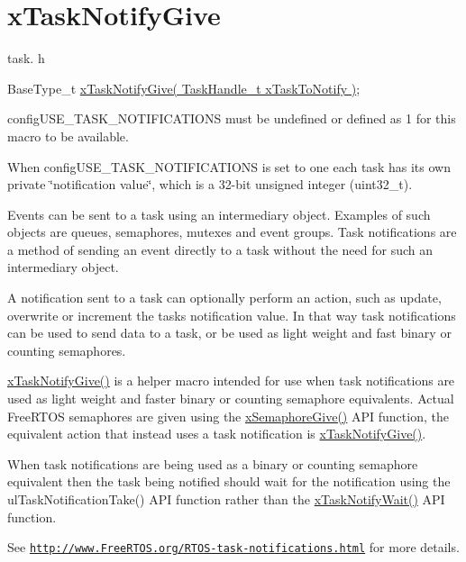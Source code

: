 \hypertarget{group__x_task_notify_give}{}\section{x\+Task\+Notify\+Give}
\label{group__x_task_notify_give}
task. h 
\begin{DoxyPre}BaseType\_t \hyperlink{task_8h_ac60cbd05577a3e4f3c3587dd9b213930}{xTaskNotifyGive( TaskHandle\_t xTaskToNotify )};\end{DoxyPre}


config\+U\+S\+E\+\_\+\+T\+A\+S\+K\+\_\+\+N\+O\+T\+I\+F\+I\+C\+A\+T\+I\+O\+NS must be undefined or defined as 1 for this macro to be available.

When config\+U\+S\+E\+\_\+\+T\+A\+S\+K\+\_\+\+N\+O\+T\+I\+F\+I\+C\+A\+T\+I\+O\+NS is set to one each task has its own private \char`\"{}notification value\char`\"{}, which is a 32-\/bit unsigned integer (uint32\+\_\+t).

Events can be sent to a task using an intermediary object. Examples of such objects are queues, semaphores, mutexes and event groups. Task notifications are a method of sending an event directly to a task without the need for such an intermediary object.

A notification sent to a task can optionally perform an action, such as update, overwrite or increment the task\textquotesingle{}s notification value. In that way task notifications can be used to send data to a task, or be used as light weight and fast binary or counting semaphores.

\hyperlink{task_8h_ac60cbd05577a3e4f3c3587dd9b213930}{x\+Task\+Notify\+Give()} is a helper macro intended for use when task notifications are used as light weight and faster binary or counting semaphore equivalents. Actual Free\+R\+T\+OS semaphores are given using the \hyperlink{semphr_8h_aae55761cabfa9bf85c8f4430f78c0953}{x\+Semaphore\+Give()} A\+PI function, the equivalent action that instead uses a task notification is \hyperlink{task_8h_ac60cbd05577a3e4f3c3587dd9b213930}{x\+Task\+Notify\+Give()}.

When task notifications are being used as a binary or counting semaphore equivalent then the task being notified should wait for the notification using the ul\+Task\+Notification\+Take() A\+PI function rather than the \hyperlink{task_8h_a0475fcda9718f403521c270a7270ff93}{x\+Task\+Notify\+Wait()} A\+PI function.

See \href{http://www.FreeRTOS.org/RTOS-task-notifications.html}{\tt http\+://www.\+Free\+R\+T\+O\+S.\+org/\+R\+T\+O\+S-\/task-\/notifications.\+html} for more details.


